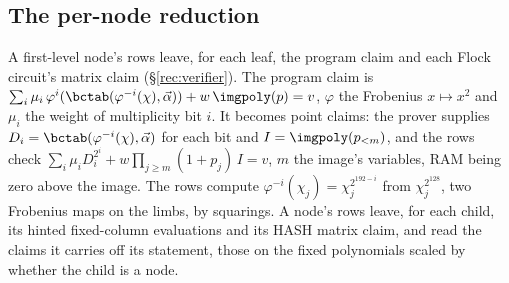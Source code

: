 \subsection{The per-node reduction}\label{rec:reduce}

A first-level node's rows leave, for each leaf, the program claim and each Flock circuit's matrix claim (\S\ref{rec:verifier}). The program claim is $\sum_i\mu_i\,\varphi^i(\bctab(\varphi^{-i}(\chi),\vec\alpha))+w\,\imgpoly(p)=v$, $\varphi$ the Frobenius $x\mapsto x^2$ and $\mu_i$ the weight of multiplicity bit $i$. It becomes point claims: the prover supplies $D_i=\bctab(\varphi^{-i}(\chi),\vec\alpha)$ for each bit and $I=\imgpoly(p_{<m})$, and the rows check $\sum_i\mu_iD_i^{2^i}+w\prod_{j\ge m}(1+p_j)\,I=v$, $m$ the image's variables, RAM being zero above the image. The rows compute $\varphi^{-i}(\chi_j)=\chi_j^{2^{192-i}}$ from $\chi_j^{2^{128}}$, two Frobenius maps on the limbs, by squarings. A node's rows leave, for each child, its hinted fixed-column evaluations and its \textsf{HASH} matrix claim, and read the claims it carries off its statement, those on the fixed polynomials scaled by whether the child is a node.

